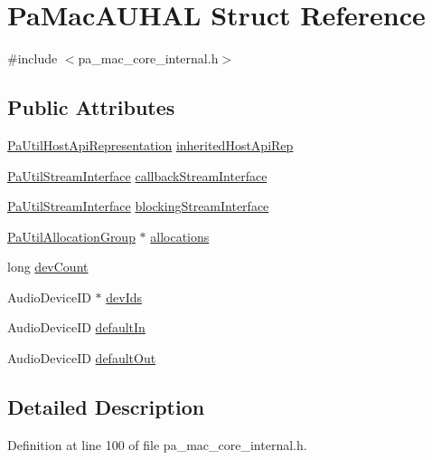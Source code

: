 \hypertarget{struct_pa_mac_a_u_h_a_l}{}\section{Pa\+Mac\+A\+U\+H\+AL Struct Reference}
\label{struct_pa_mac_a_u_h_a_l}


{\ttfamily \#include $<$pa\+\_\+mac\+\_\+core\+\_\+internal.\+h$>$}

\subsection*{Public Attributes}
\begin{DoxyCompactItemize}
\item 
\hyperlink{struct_pa_util_host_api_representation}{Pa\+Util\+Host\+Api\+Representation} \hyperlink{struct_pa_mac_a_u_h_a_l_abe5cf67f9992b647d350cd9fb890a081}{inherited\+Host\+Api\+Rep}
\item 
\hyperlink{struct_pa_util_stream_interface}{Pa\+Util\+Stream\+Interface} \hyperlink{struct_pa_mac_a_u_h_a_l_a747f231b18878ff0cc7918bbd4df5e21}{callback\+Stream\+Interface}
\item 
\hyperlink{struct_pa_util_stream_interface}{Pa\+Util\+Stream\+Interface} \hyperlink{struct_pa_mac_a_u_h_a_l_aa7c1cb635e954f37e178e7f037f6cbfb}{blocking\+Stream\+Interface}
\item 
\hyperlink{struct_pa_util_allocation_group}{Pa\+Util\+Allocation\+Group} $\ast$ \hyperlink{struct_pa_mac_a_u_h_a_l_a7fdcaf9a58f5f439ac970ca19012b41c}{allocations}
\item 
long \hyperlink{struct_pa_mac_a_u_h_a_l_a192eec8334acc33171a90d4c6dce4c90}{dev\+Count}
\item 
Audio\+Device\+ID $\ast$ \hyperlink{struct_pa_mac_a_u_h_a_l_a2b9cc8201b12b88cea1acb9e2cc30c21}{dev\+Ids}
\item 
Audio\+Device\+ID \hyperlink{struct_pa_mac_a_u_h_a_l_adcadc778ee059bbbd6cbcb76ac93931b}{default\+In}
\item 
Audio\+Device\+ID \hyperlink{struct_pa_mac_a_u_h_a_l_ae4876213ad54aeebea056e458dff4bfd}{default\+Out}
\end{DoxyCompactItemize}


\subsection{Detailed Description}


Definition at line 100 of file pa\+\_\+mac\+\_\+core\+\_\+internal.\+h.



